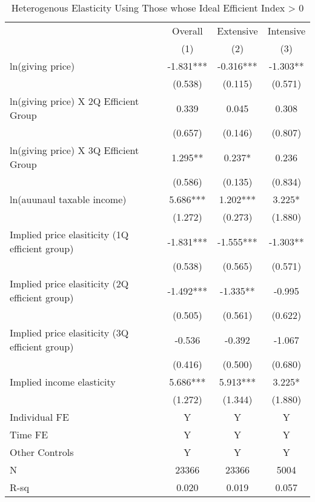 \documentclass[ review  , 3p ]{elsarticle}
\begin{document}
  \begin{table}
  
  \caption{\label{tab:kableSubsetHeteroElasticity}Heterogenous Elasticity Using Those whose Ideal Efficient Index > 0}
  \centering
  \fontsize{8}{10}\selectfont
  \begin{threeparttable}
  \begin{tabular}[t]{lccc}
  \toprule
  \multicolumn{1}{c}{ } & \multicolumn{1}{c}{Overall} & \multicolumn{1}{c}{Extensive} & \multicolumn{1}{c}{Intensive} \\
  \cmidrule(l{3pt}r{3pt}){2-2} \cmidrule(l{3pt}r{3pt}){3-3} \cmidrule(l{3pt}r{3pt}){4-4}
   & (1) & (2) & (3)\\
  \midrule
  ln(giving price) & -1.831*** & -0.316*** & -1.303**\\
   & (0.538) & (0.115) & (0.571)\\
  ln(giving price) X 2Q Efficient Group & 0.339 & 0.045 & 0.308\\
   & (0.657) & (0.146) & (0.807)\\
  ln(giving price) X 3Q Efficient Group & 1.295** & 0.237* & 0.236\\
   & (0.586) & (0.135) & (0.834)\\
  ln(auunaul taxable income) & 5.686*** & 1.202*** & 3.225*\\
   & (1.272) & (0.273) & (1.880)\\
  Implied price elasiticity (1Q efficient group) & -1.831*** & -1.555*** & -1.303**\\
   & (0.538) & (0.565) & (0.571)\\
  Implied price elasiticity (2Q efficient group) & -1.492*** & -1.335** & -0.995\\
   & (0.505) & (0.561) & (0.622)\\
  Implied price elasiticity (3Q efficient group) & -0.536 & -0.392 & -1.067\\
   & (0.416) & (0.500) & (0.680)\\
  Implied income elasticity & 5.686*** & 5.913*** & 3.225*\\
   & (1.272) & (1.344) & (1.880)\\
  Individual FE & Y & Y & Y\\
  Time FE & Y & Y & Y\\
  Other Controls & Y & Y & Y\\
  N & 23366 & 23366 & 5004\\
  R-sq & 0.020 & 0.019 & 0.057\\
  \bottomrule
  \end{tabular}

\end{threeparttable}
\end{table}
\end{document}
